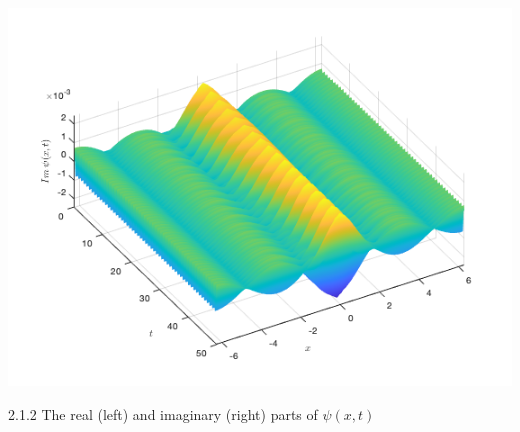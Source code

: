 \documentclass[12pt, letterpaper, twoside]{article}
\begin{document}
\begin{enumerate}[label=(\roman*)]
\begin{multicols}{2}
\begin{center}
    \includegraphics[scale=0.35]{Figures/(b-2imag).png}
\end{center}
\end{multicols}
\figurename{ 2.1.2 The real (left) and imaginary (right) parts of $\psi(x, t)$}


\end{enumerate}
\end{document}

